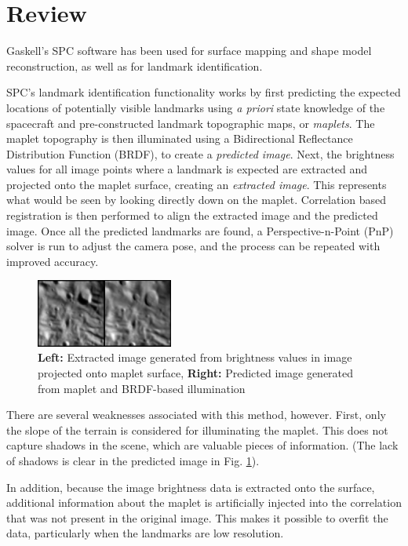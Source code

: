 \documentclass{src/RPI-SIW}
\begin{document}
\section*{Review}
Gaskell's SPC software has been used for surface mapping and shape model reconstruction, as well as for landmark identification.\cite{gaskell2008} 

SPC's landmark identification functionality works by first predicting the expected locations of potentially visible landmarks using \textit{a priori} state knowledge of the spacecraft and pre-constructed landmark topographic maps, or \textit{maplets}.  The maplet topography is then illuminated using a Bidirectional Reflectance Distribution Function (BRDF), to create a \textit{predicted image}.  Next, the brightness values for all image points where a landmark is expected are extracted and projected onto the maplet surface, creating an \textit{extracted image}.  This represents what would be seen by looking directly down on the maplet.  Correlation based registration is then performed to align the extracted image and the predicted image.  Once all the predicted landmarks are found, a Perspective-n-Point (PnP) solver is run to adjust the camera pose, and the process can be repeated with improved accuracy.\cite{gaskell2011}

\begin{figure}[H]
	\centering
	\includegraphics[width=0.4\textwidth]{figs/spc_sample.png}
	\caption{\textbf{Left:} Extracted image generated from brightness values in image projected onto maplet surface, \textbf{Right:} Predicted image generated from maplet and BRDF-based illumination}
	\label{figs::spc_match}
\end{figure}

There are several weaknesses associated with this method, however.  First, only the slope of the terrain is considered for illuminating the maplet.  This does not capture shadows in the scene, which are valuable pieces of information.  (The lack of shadows is clear in the predicted image in Fig. \ref{figs::spc_match}).  

In addition, because the image brightness data is extracted onto the surface, additional information about the maplet is artificially injected into the correlation that was not present in the original image.  This makes it possible to overfit the data, particularly when the landmarks are low resolution.
\end{document}
